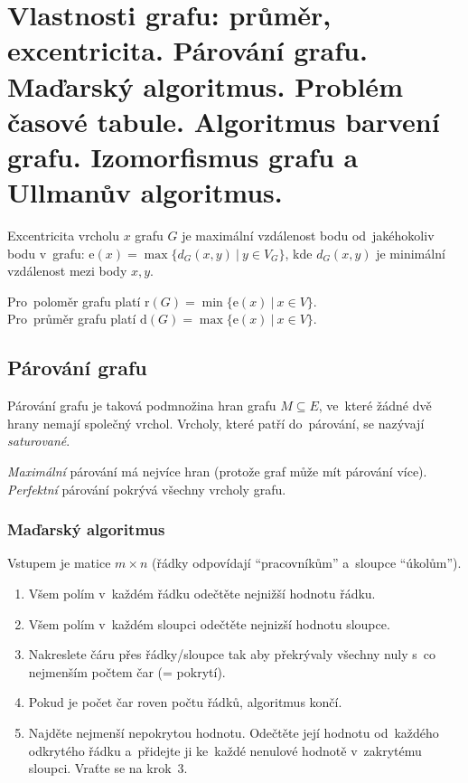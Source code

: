 \clearpage
\section{Vlastnosti grafu: průměr, excentricita. Párování grafu. Maďarský algoritmus. Problém časové tabule. Algoritmus barvení grafu. Izomorfismus grafu a Ullmanův algoritmus.}

Excentricita vrcholu $x$ grafu $G$ je maximální vzdálenost bodu od~jakéhokoliv bodu v~grafu: $\mathrm{e}(x) = \max\{ d_G(x, y) \ |\ y \in V_G\}$, kde $d_G(x,y)$ je minimální vzdálenost mezi body $x, y$.

{}Pro~poloměr grafu platí $\mathrm{r}(G) = \min\{ \mathrm{e}(x)\ |\ x \in V \}$.
\\Pro~průměr grafu platí $\mathrm{d}(G) = \max\{ \mathrm{e}(x)\ |\ x \in V \}$.

\subsection{Párování grafu}

Párování grafu je taková podmnožina hran grafu $M \subseteq E$, ve~které žádné dvě hrany nemají společný vrchol.
Vrcholy, které patří do~párování, se nazývají \emph{saturované}.

{}\emph{Maximální} párování má nejvíce hran (protože graf může mít párování více).
\\\emph{Perfektní} párování pokrývá všechny vrcholy grafu.

\subsubsection{Maďarský algoritmus}

Vstupem je matice $m \times n$ (řádky odpovídají \enquote{pracovníkům} a~sloupce \enquote{úkolům}).

\begin{enumerate}
    \item Všem polím v~každém řádku odečtěte nejnižší hodnotu řádku.
    \item Všem polím v~každém sloupci odečtěte nejnizší hodnotu sloupce.
    \item Nakreslete čáru přes řádky/sloupce tak aby překrývaly všechny nuly s~co nejmenším počtem čar (= pokrytí).
    \item Pokud je počet čar roven počtu řádků, algoritmus končí.
    \item Najděte nejmenší nepokrytou hodnotu. Odečtěte její hodnotu od~každého odkrytého řádku a~přidejte ji ke~každé nenulové hodnotě v~zakrytému sloupci. Vraťte se na krok~3.
\end{enumerate}

